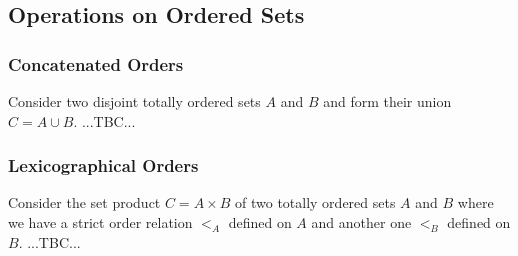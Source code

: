 

\subsection{Operations on Ordered Sets}


\subsubsection{Concatenated Orders}
Consider two disjoint totally ordered sets $A$ and $B$ and form their union $C = A \cup B$. ...TBC...





\subsubsection{Lexicographical Orders}
Consider the set product $C = A \times B$ of two totally ordered sets $A$ and $B$ where we have a strict order relation $<_A$ defined on $A$ and another one $<_B$ defined on $B$. ...TBC...

